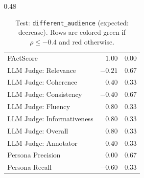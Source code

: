 \begin{table}[htbp]
\begin{subtable}[t]{0.48\textwidth}
\begin{tabular}{lrr}
\midrule
\rowcolor{matchFalse} FActScore                             &   $1.00$ &  0.00 \\
\rowcolor{matchFalse} LLM Judge: Relevance                  &  $-0.21$ &  0.67 \\
\rowcolor{matchFalse} LLM Judge: Coherence                  &   $0.40$ &  0.33 \\
\rowcolor{matchTrue} LLM Judge: Consistency                &  $-0.40$ &  0.67 \\
\rowcolor{matchFalse} LLM Judge: Fluency                    &   $0.80$ &  0.33 \\
\rowcolor{matchFalse} LLM Judge: Informativeness            &   $0.80$ &  0.33 \\
\rowcolor{matchFalse} LLM Judge: Overall                    &   $0.80$ &  0.33 \\
\rowcolor{matchFalse} LLM Judge: Annotator        &   $0.40$ &  0.33 \\
\rowcolor{matchFalse} Persona Precision                     &   $0.00$ &  0.67 \\
\rowcolor{matchTrue} Persona Recall                        &  $-0.60$ &  0.33 \\
\bottomrule
\end{tabular}
\caption{LLM metrics}
\end{subtable}
\caption[Test: \texttt{different\_audience} (expected: decrease).]{Test: \texttt{different\_audience} (expected: decrease). Rows are colored green if $\rho\leq-0.4$ and red otherwise.}
\label{tab:different_audience}
\end{table}


